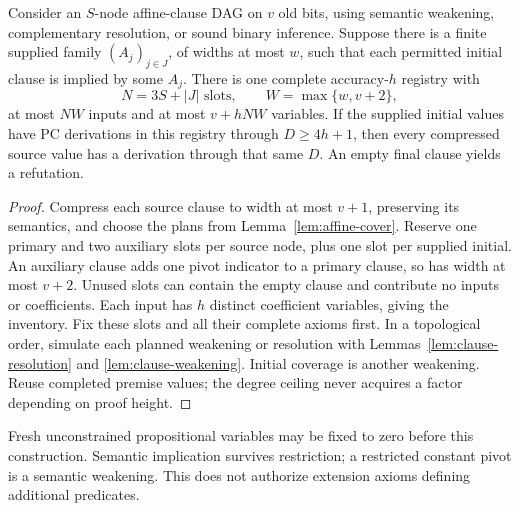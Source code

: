 \begin{theorem}\label{thm:dag-registry}
Consider an \(S\)-node affine-clause DAG on \(v\) old bits, using semantic
weakening, complementary resolution, or sound binary inference. Suppose
there is a finite supplied family \((A_j)_{j\in J}\), of widths at most
\(w\), such that each permitted initial clause is implied by some \(A_j\).
There is one complete accuracy-\(h\) registry with
\[
 N=3S+|J|\text{ slots},\qquad W=\max\{w,v+2\},
\]
at most \(NW\) inputs and at most \(v+hNW\) variables. If the supplied
initial values have PC derivations in this registry through
\(D\ge4h+1\), then every compressed source value has a derivation through
that same \(D\). An empty final clause yields a refutation.
\end{theorem}
\begin{proof}
Compress each source clause to width at most \(v+1\), preserving its
semantics, and choose the plans from Lemma~\ref{lem:affine-cover}.
Reserve one primary and two auxiliary slots per source node, plus one
slot per supplied initial. An auxiliary clause adds one pivot indicator
to a primary clause, so has width at most \(v+2\). Unused slots can
contain the empty clause and contribute no inputs or coefficients.
Each input has \(h\) distinct coefficient variables, giving the inventory.
Fix these slots and all their complete axioms first. In a topological
order, simulate each planned weakening or resolution with
Lemmas~\ref{lem:clause-resolution} and \ref{lem:clause-weakening}.
Initial coverage is another weakening. Reuse completed premise values;
the degree ceiling never acquires a factor depending on proof height.
\end{proof}

Fresh unconstrained propositional variables may be fixed to zero before
this construction. Semantic implication survives restriction; a restricted
constant pivot is a semantic weakening. This does not authorize extension
axioms defining additional predicates.

